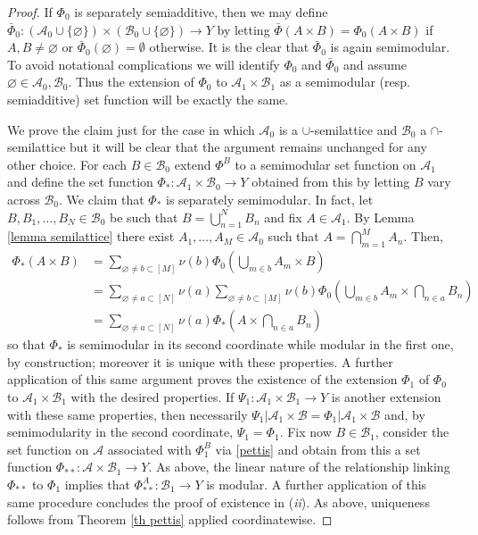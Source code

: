 \documentclass[11pt]{amsart}
\theoremstyle{plain}
\begin{document}
\begin{proof}
If $\Phi_0$ is separately semiadditive, then we may define 
$\bar\Phi_0:({\mathscr{A}}_0\cup\{{\varnothing}\})\times(\mathscr B_0\cup\{{\varnothing}\})\to Y$
by letting $\bar\Phi(A\times B)=\Phi_0(A\times B)$ if $A,B\ne{\varnothing}$
or $\bar\Phi_0({\varnothing})={\emptyset}$ otherwise. It is the clear that $\bar\Phi_0$ is again
semimodular. To avoid notational complications we will identify $\Phi_0$
and $\bar\Phi_0$ and assume ${\varnothing}\in{\mathscr{A}}_0,\mathscr B_0$. Thus the extension
of $\Phi_0$ to ${\mathscr{A}}_1\times\mathscr B_1$ as a semimodular (resp. semiadditive)
set function will be exactly the same.

We prove the claim just for the case in which ${\mathscr{A}}_0$ is a $\cup$-semilattice and 
$\mathscr B_0$ a $\cap$-semilattice but it will be clear that the argument remains 
unchanged for any other choice. For each $B\in\mathscr B_0$ extend $\Phi^B$ to 
a semimodular set function on ${\mathscr{A}}_1$ and define the set function 
$\Phi_*:{\mathscr{A}}_1\times\mathscr B_0\to Y$ obtained from this by letting $B$ vary across 
$\mathscr B_0$. We claim that $\Phi_*$ is separately semimodular. In fact, let 
$B,B_1,\ldots,B_N\in\mathscr B_0$ be such that $B=\bigcup_{n=1}^NB_n$ and 
fix $A\in{\mathscr{A}}_1$. By Lemma \ref{lemma semilattice} there exist 
$A_1,\ldots,A_M\in{\mathscr{A}}_0$ such that $A=\bigcap_{m=1}^MA_n$. Then,
\begin{align*}
\Phi_*(A\times B)
&=
\sum_{{\varnothing}\ne b\subset [M]}\nu(b)\Phi_0\left(\bigcup_{m\in b}A_m\times B\right)\\
&=
\sum_{{\varnothing}\ne a\subset [N]}\nu(a)\sum_{{\varnothing}\ne b\subset [M]}\nu(b)
\Phi_0\left(\bigcup_{m\in b}A_m\times\bigcap_{n\in a} B_n\right)\\
&=
\sum_{{\varnothing}\ne a\subset [N]}\nu(a)\Phi_*\left(A\times\bigcap_{n\in a} B_n\right)
\end{align*}
so that $\Phi_*$ is semimodular in its second coordinate while modular in the first one, 
by construction; moreover it is unique with these properties. A further application of this 
same argument proves the existence of the extension $\Phi_1$ of $\Phi_0$ to
${\mathscr{A}}_1\times\mathscr B_1$ with the desired properties. If $\Psi_1:{{\mathscr{A}}_{{1}}\times\mathscr B_{{1}}}\to Y$ is 
another extension with these same properties, then necessarily 
${{\Psi_1}\vert {{\mathscr{A}}_1\times\mathscr B}}={{\Phi_1}\vert {{\mathscr{A}}_1\times\mathscr B}}$ and,
by semimodularity in the second coordinate, $\Psi_1=\Phi_1$. Fix now $B\in\mathscr B_1$, 
consider the set function on ${\mathscr{A}}$ associated with $\Phi_1^B$ via \eqref{pettis} and obtain 
from this a set function $\Phi_{**}:{\mathscr{A}}\times\mathscr B_1\to Y$. As above, the linear nature 
of the relationship linking $\Phi_{**}$ to $\Phi_1$ implies that 
$\Phi^A_{**}:\mathscr B_1\to Y$ is modular. A further application of this same procedure 
concludes the proof of existence in (\textit{ii}). As above, uniqueness follows from 
Theorem \ref{th pettis} applied coordinatewise.
\end{proof}
\end{document}
